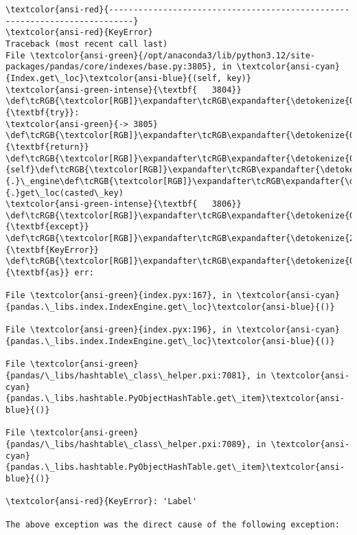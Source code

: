\documentclass[11pt]{article}
\begin{document}
    \begin{Verbatim}[commandchars=\\\{\}, frame=single, framerule=2mm, rulecolor=\color{outerrorbackground}]
\textcolor{ansi-red}{---------------------------------------------------------------------------}
\textcolor{ansi-red}{KeyError}                                  Traceback (most recent call last)
File \textcolor{ansi-green}{/opt/anaconda3/lib/python3.12/site-packages/pandas/core/indexes/base.py:3805}, in \textcolor{ansi-cyan}{Index.get\_loc}\textcolor{ansi-blue}{(self, key)}
\textcolor{ansi-green-intense}{\textbf{   3804}} \def\tcRGB{\textcolor[RGB]}\expandafter\tcRGB\expandafter{\detokenize{0,135,0}}{\textbf{try}}:
\textcolor{ansi-green}{-> 3805}     \def\tcRGB{\textcolor[RGB]}\expandafter\tcRGB\expandafter{\detokenize{0,135,0}}{\textbf{return}} \def\tcRGB{\textcolor[RGB]}\expandafter\tcRGB\expandafter{\detokenize{0,135,0}}{self}\def\tcRGB{\textcolor[RGB]}\expandafter\tcRGB\expandafter{\detokenize{98,98,98}}{.}\_engine\def\tcRGB{\textcolor[RGB]}\expandafter\tcRGB\expandafter{\detokenize{98,98,98}}{.}get\_loc(casted\_key)
\textcolor{ansi-green-intense}{\textbf{   3806}} \def\tcRGB{\textcolor[RGB]}\expandafter\tcRGB\expandafter{\detokenize{0,135,0}}{\textbf{except}} \def\tcRGB{\textcolor[RGB]}\expandafter\tcRGB\expandafter{\detokenize{215,95,95}}{\textbf{KeyError}} \def\tcRGB{\textcolor[RGB]}\expandafter\tcRGB\expandafter{\detokenize{0,135,0}}{\textbf{as}} err:

File \textcolor{ansi-green}{index.pyx:167}, in \textcolor{ansi-cyan}{pandas.\_libs.index.IndexEngine.get\_loc}\textcolor{ansi-blue}{()}

File \textcolor{ansi-green}{index.pyx:196}, in \textcolor{ansi-cyan}{pandas.\_libs.index.IndexEngine.get\_loc}\textcolor{ansi-blue}{()}

File \textcolor{ansi-green}{pandas/\_libs/hashtable\_class\_helper.pxi:7081}, in \textcolor{ansi-cyan}{pandas.\_libs.hashtable.PyObjectHashTable.get\_item}\textcolor{ansi-blue}{()}

File \textcolor{ansi-green}{pandas/\_libs/hashtable\_class\_helper.pxi:7089}, in \textcolor{ansi-cyan}{pandas.\_libs.hashtable.PyObjectHashTable.get\_item}\textcolor{ansi-blue}{()}

\textcolor{ansi-red}{KeyError}: 'Label'

The above exception was the direct cause of the following exception:


\end{Verbatim}
\end{document}
